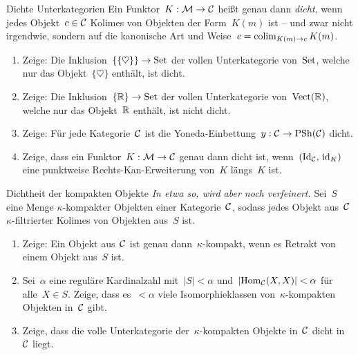 \documentclass{uebblatt}
\begin{document}

\begin{aufgabe}{Dichte Unterkategorien}
Ein Funktor~$K : \mathcal{M} \to \mathcal{C}$ heißt genau dann \emph{dicht}, wenn jedes Objekt~$c
\in \mathcal{C}$ Kolimes von Objekten der Form~$K(m)$ ist -- und zwar nicht irgendwie,
sondern auf die kanonische Art und Weise~$c = \operatorname*{colim}_{K(m) \to c} K(m)$.
\begin{enumerate}
\item Zeige: Die Inklusion~$\{\{\heartsuit\}\} \to \mathrm{Set}$ der vollen
Unterkategorie von~$\mathrm{Set}$, welche nur das Objekt~$\{\heartsuit\}$ enthält, ist
dicht.
\item Zeige: Die Inklusion~$\{\mathbb{R}\} \to \mathrm{Set}$ der vollen
Unterkategorie von~$\mathrm{Vect}(\mathbb{R})$, welche nur das Objekt~$\mathbb{R}$ enthält, ist
nicht dicht.
\item Zeige: Für jede Kategorie~$\mathcal{C}$ ist die Yoneda-Einbettung~$y : \mathcal{C} \to
\mathrm{PSh}(\mathcal{C})$ dicht.
\item Zeige, dass ein Funktor~$K : \mathcal{M} \to \mathcal{C}$ genau dann dicht ist,
wenn~$(\mathrm{Id}_{\mathcal{C}},\,\mathrm{id}_K)$ eine punktweise Rechts-Kan-Erweiterung von~$K$
längs~$K$ ist.
\end{enumerate}
\end{aufgabe}

\begin{aufgabe}{Dichtheit der kompakten Objekte}
\emph{In etwa so, wird aber noch verfeinert.}
Sei~$S$ eine Menge $\kappa$-kompakter Objekten einer Kategorie~$\mathcal{C}$, 
sodass jedes Objekt aus~$\mathcal{C}$ $\kappa$-filtrierter Kolimes von Objekten aus~$S$
ist.
\begin{enumerate}
\item Zeige: Ein Objekt aus~$\mathcal{C}$ ist genau dann~$\kappa$-kompakt, wenn es
Retrakt von einem Objekt aus~$S$ ist.
\item Sei~$\alpha$ eine reguläre Kardinalzahl mit~$|S| < \alpha$
und~$|\mathrm{Hom}_{\mathcal{C}}(X,X)| < \alpha$ für alle~$X \in S$. Zeige, dass es~$< \alpha$
viele Isomorphieklassen von~$\kappa$-kompakten Objekten in~$\mathcal{C}$
gibt.
\item Zeige, dass die volle Unterkategorie der~$\kappa$-kompakten Objekte in~$\mathcal{C}$ dicht
in~$\mathcal{C}$ liegt.
\end{enumerate}
%
\end{aufgabe}
\end{document}
